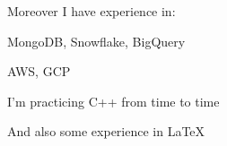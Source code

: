Moreover I have experience in:
\begin{bulist}
  \item MongoDB, Snowflake, BigQuery
  \item AWS, GCP
  \item I'm practicing C++ from time to time
\end{bulist}
And also some experience in \LaTeX

